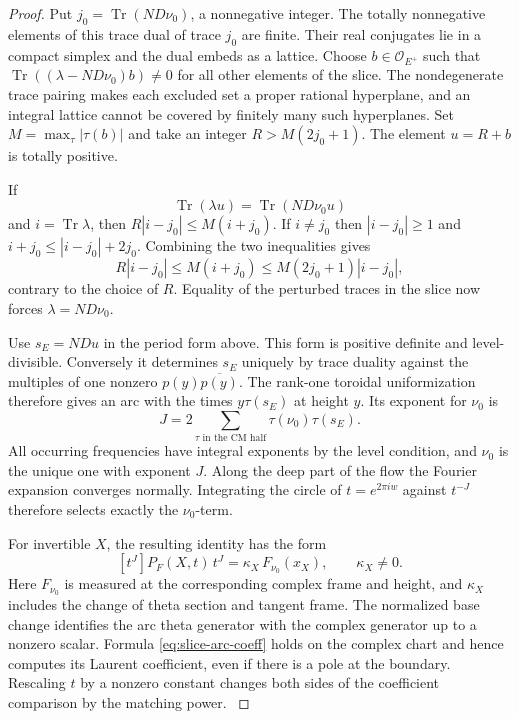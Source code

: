 \begin{proof}
Put \(j_0=\operatorname{Tr}(ND\nu_0)\), a nonnegative integer.
The totally nonnegative elements of this trace dual of trace
\(j_0\) are finite. Their real conjugates lie in a compact
simplex and the dual embeds as a lattice. Choose
\(b\in\mathcal O_{E^+}\) such that
\(\operatorname{Tr}((\lambda-ND\nu_0)b)\ne0\) for all other
elements of the slice. The nondegenerate trace pairing makes
each excluded set a proper rational hyperplane, and an
integral lattice cannot be covered by finitely many such
hyperplanes. Set \(M=\max_\tau |\tau(b)|\) and take an
integer \(R>M(2j_0+1)\). The element \(u=R+b\) is totally
positive.

If 
\[
  \operatorname{Tr}(\lambda u)=
\operatorname{Tr}(ND\nu_0 u)
\]
 and \(i=\operatorname{Tr}\lambda\),
then \(R|i-j_0|\le M(i+j_0)\). If \(i\ne j_0\) then \(|i-j_0|\ge1\) and
\(i+j_0\le |i-j_0|+2j_0\). Combining the two inequalities gives
\[
 R|i-j_0|\le M(i+j_0)\le M(2j_0+1)|i-j_0|,
\]
contrary to the choice of \(R\).
Equality of the perturbed traces in the slice now forces
\(\lambda=ND\nu_0\).

Use \(s_E=NDu\) in the period form above. This form is
positive definite and level-divisible. Conversely it determines
\(s_E\) uniquely by trace duality against the multiples of
one nonzero \(p(y)\overline{p(y)}\). The rank-one toroidal
uniformization therefore gives an arc with the times
\(y\tau(s_E)\) at height \(y\). Its exponent for \(\nu_0\) is
\[
 J=2\sum_{\tau\text{ in the CM half}}
              \tau(\nu_0)\tau(s_E).
\]
All occurring frequencies have integral exponents by the level
condition, and \(\nu_0\) is the unique one with exponent \(J\).
Along the deep part of the flow the Fourier expansion converges
normally. Integrating the circle of \(t=e^{2\pi i w}\) against
\(t^{-J}\) therefore selects exactly the \(\nu_0\)-term.

For invertible \(X\), the resulting identity has the form
\begin{equation}\label{eq:slice-arc-coeff}
     [t^J]P_F(X,t)\,t^J
          = \kappa_X\,F_{\nu_0}(x_X),
          \qquad \kappa_X\ne0 .
\end{equation}
Here \(F_{\nu_0}\) is measured at the corresponding complex
frame and height, and \(\kappa_X\) includes the change of
theta section and tangent frame. The normalized base change
identifies the arc theta generator with the complex generator
up to a nonzero scalar. Formula \eqref{eq:slice-arc-coeff}
holds on the complex chart and hence computes its Laurent
coefficient, even if there is a pole at the boundary. Rescaling
\(t\) by a nonzero constant changes both sides of the coefficient
comparison by the matching power.
\label{cor:slice-cm-coefficients-2}


\end{proof}

